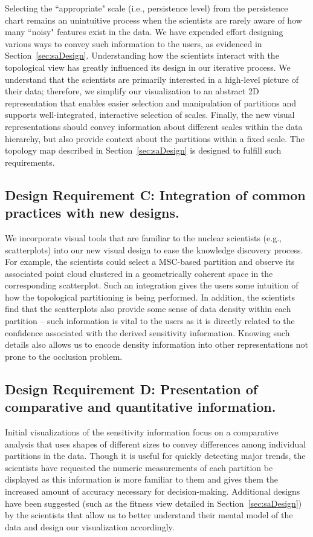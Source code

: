Selecting the ``appropriate" scale (i.e., persistence level) from the persistence chart remains an unintuitive process when the scientists are rarely aware of how many ``noisy" features exist in the data. We have expended effort designing various ways to convey such information to the users, as evidenced in Section~\ref{sec:saDesign}.
%
Understanding how the scientists interact with the topological view has greatly influenced its design in our iterative process.
%
We understand that the scientists are primarily interested in a high-level picture of their data; therefore, we simplify our visualization to an abstract 2D representation that enables easier selection and manipulation of partitions and supports well-integrated, interactive selection of scales.
%
Finally, the new visual representations should convey information about different scales within the data hierarchy, but also provide context about the
partitions within a fixed scale.
%
The topology map described in Section~\ref{sec:saDesign} is designed to fulfill such requirements.

\subsection{Design Requirement C: Integration of common practices with new designs.}

We incorporate visual tools that are familiar to the nuclear scientists (e.g., scatterplots) into our new visual design to ease the knowledge discovery process.
%
For example, the scientists could select a MSC-based partition and observe its associated point cloud clustered in a geometrically coherent space in the corresponding scatterplot.
%
Such an integration gives the users some intuition of how the topological partitioning is being performed.
%
In addition, the scientists find that the scatterplots also provide some sense of data density within each partition -- such information is vital to the users as it is directly related to the confidence associated with the derived sensitivity information.
%
Knowing such details also allows us to encode density information into other representations not prone to the occlusion problem.

\subsection{Design Requirement D: Presentation of comparative and quantitative information.}

Initial visualizations of the sensitivity information focus on a comparative analysis that uses shapes of different sizes to convey differences among individual  partitions in the data.
%
Though it is useful for quickly detecting major trends, the scientists have requested the numeric measurements of each partition be displayed as this information is more familiar to them and gives them the increased amount of accuracy necessary for decision-making.
%
Additional designs have been suggested (such as the fitness view detailed in Section~\ref{sec:saDesign}) by the scientists that allow us to better understand their mental model of the data and design our visualization accordingly.

